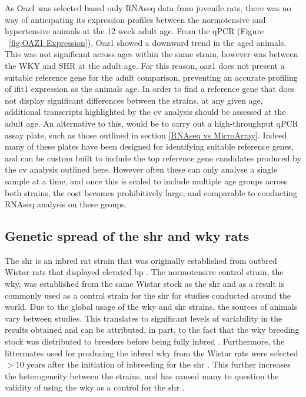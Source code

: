 As Oaz1 was selected based only RNAseq data from juvenile rats, there was no way of anticipating its expression profiles between the normotensive and hypertensive animals at the 12 week adult age. From the qPCR (Figure ~\ref{fig:OAZ1 Expression}), Oaz1 showed a downward trend in the aged animals. This was not significant across ages within the same strain, however was between the WKY and SHR at the adult age. For this reason, oaz1 does not present a suitable reference gene for the adult comparison, preventing an accurate profiling of ifit1 expression as the animals age. In order to find a reference gene that does not display significant differences between the strains, at any given age, additional transcripts highlighted by the \acrshort{cv} analysis should be assessed at the adult age. An alternative to this, would be to carry out a high-throughput qPCR assay plate, such as those outlined in section \ref{RNAseq vs MicroArray}. Indeed many of these plates have been designed for identifying suitable reference genes, and can be custom built to include the top reference gene candidates produced by the \acrshort{cv} analysis outlined here. However often these can only analyse a single sample at a time, and once this is scaled to include multiple age groups across both strains, the cost becomes prohibitively large, and comparable to conducting RNAseq analysis on these groups. 

\subsection{Genetic spread of the \acrshort{shr} and \acrshort{wky} rats} \label{geneticspread}

The \acrshort{shr} is an inbred rat strain that was originally established from outbred Wistar rats that displayed elevated \acrshort{bp} \cite{NAP20031}. The normotensive control strain, the \acrshort{wky}, was established from the same Wistar stock as the \acrshort{shr} and as a result is commonly used as a control strain for the \acrshort{shr} for studies conducted around the world. Due to the global usage of the \acrshort{wky} and \acrshort{shr} strains, the sources of animals vary between studies. This translates to significant levels of variability in the results obtained and can be attributed, in part, to the fact that the \acrshort{wky} breeding stock was distributed to breeders before being fully inbred \cite{Kurtz1989,Louis1990,Pare1997}. Furthermore, the littermates used for producing the inbred \acrshort{wky} from the Wistar rats were selected $>$10 years after the initiation of inbreeding for the \acrshort{shr} \cite{Louis1990}. This further increases the heterogeneity between the strains, and has caused many to question the validity of using the \acrshort{wky} as a control for the \acrshort{shr} \cite{StLezin1992}.

